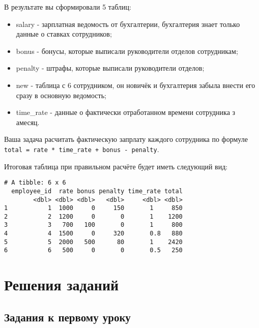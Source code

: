 \documentclass[
]{book}
\providecommand{\tightlist}{%
  \setlength{\itemsep}{0pt}\setlength{\parskip}{0pt}}
\begin{document}
В результате вы сформировали 5 таблиц:

\begin{itemize}
\tightlist
\item
  salary - зарплатная ведомость от бухгалтерии, бухгалтерия знает только данные о ставках сотрудников;
\item
  bonus - бонусы, которые выписали руководители отделов сотрудникам;
\item
  penalty - штрафы, которые выписали руководители отделов;
\item
  new - таблица с 6 сотрудником, он новичёк и бухгалтерия забыла внести его сразу в основную ведомость;
\item
  time\_rate - данные о фактически отработанном времени сотрудника з амесяц.
\end{itemize}

Ваша задача расчитать фактическую запрлату каждого сотрудника по формуле \texttt{total\ =\ rate\ *\ time\_rate\ +\ bonus\ -\ penalty}.

Итоговая таблица при правильном расчёте будет иметь следующий вид:

\begin{verbatim}
# A tibble: 6 x 6
  employee_id  rate bonus penalty time_rate total
        <dbl> <dbl> <dbl>   <dbl>     <dbl> <dbl>
1           1  1000     0     150       1     850
2           2  1200     0       0       1    1200
3           3   700   100       0       1     800
4           4  1500     0     320       0.8   880
5           5  2000   500      80       1    2420
6           6   500     0       0       0.5   250
\end{verbatim}

\hypertarget{ux440ux435ux448ux435ux43dux438ux44f-ux437ux430ux434ux430ux43dux438ux439}{%
\chapter*{Решения заданий}\label{ux440ux435ux448ux435ux43dux438ux44f-ux437ux430ux434ux430ux43dux438ux439}}

\hypertarget{ux437ux430ux434ux430ux43dux438ux44f-ux43a-ux43fux435ux440ux432ux43eux43cux443-ux443ux440ux43eux43aux443}{%
\section*{Задания к первому уроку}\label{ux437ux430ux434ux430ux43dux438ux44f-ux43a-ux43fux435ux440ux432ux43eux43cux443-ux443ux440ux43eux43aux443}}
\end{document}
